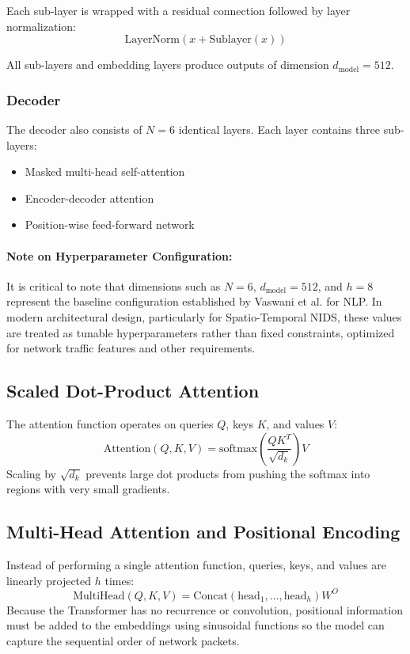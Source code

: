\documentclass[12pt, a4paper]{report}
\begin{document}
Each sub-layer is wrapped with a residual connection followed by layer normalization:
\begin{equation}
\text{LayerNorm}(x + \text{Sublayer}(x))
\end{equation}

All sub-layers and embedding layers produce outputs of dimension $d_{\text{model}} = 512$.

\subsubsection{Decoder}
The decoder also consists of $N = 6$ identical layers.  
Each layer contains three sub-layers:
\begin{itemize}
    \item Masked multi-head self-attention
    \item Encoder-decoder attention
    \item Position-wise feed-forward network
\end{itemize}

\paragraph{Note on Hyperparameter Configuration:} 
It is critical to note that dimensions such as $N=6$, $d_{\text{model}}=512$, and $h=8$ represent the baseline configuration established by Vaswani et al. \cite{vaswani2017attention} for NLP. In modern architectural design, particularly for Spatio-Temporal NIDS, these values are treated as tunable hyperparameters rather than fixed constraints, optimized for network traffic features and other requirements.

\subsection{Scaled Dot-Product Attention}
The attention function operates on queries $Q$, keys $K$, and values $V$:
\begin{equation}
\text{Attention}(Q,K,V) = \text{softmax}\left(\frac{QK^T}{\sqrt{d_k}}\right)V
\end{equation}
Scaling by $\sqrt{d_k}$ prevents large dot products from pushing the softmax into regions with very small gradients.

\subsection{Multi-Head Attention and Positional Encoding}
Instead of performing a single attention function, queries, keys, and values are linearly projected $h$ times:
\begin{equation}
\text{MultiHead}(Q,K,V) = \text{Concat}(\text{head}_1, \dots, \text{head}_h) W^O
\end{equation}
Because the Transformer has no recurrence or convolution, positional information must be added to the embeddings using sinusoidal functions so the model can capture the sequential order of network packets.
\end{document}
